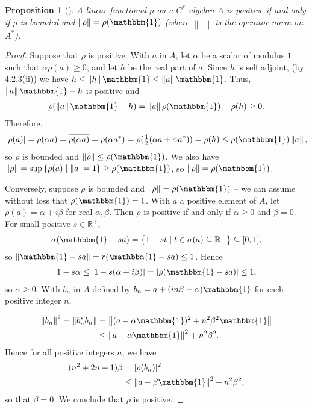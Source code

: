\documentclass[11pt,a4paper]{report}
\theoremstyle{plain}
\newtheorem{prop}{Proposition}
\theoremstyle{definition}
\newcommand{\1}{\mathbbm{1}}
\newcommand{\R}{\mathbb{R}}
\newcommand{\spec}[1]{\sigma(#1)}
\begin{document}
\begin{prop}[{\cite[4.3.2]{kadison83}}]\label{prop:432}
	A linear functional $\rho$ on a $C^\ast$-algebra $A$ is positive if and only if 
	$\rho$ is bounded and $\left\|\rho\right\| = \rho(\1)$ (where 
	$\left\|\cdot\right\|$ is the operator norm on $A^\ast$).
\end{prop}
\begin{proof}
	Suppose that $\rho$ is positive. With $a$ in $A$, let $\alpha$ be a scalar of 
	modulus $1$ such that $\alpha\rho(a)\geq 0$, and let $h$ be the real part of 
	$a$. Since $h$ is self adjoint, (by 4.2.3(ii)) we have $h \leq \left\|h\right\|\1 
	\leq \left\|a\right\|\1$. Thus, $\left\|a\right\|\1-h$ is positive and 
	\begin{align*}
		\rho(\left\|a\right\|\1-h) = \left\|a\right\|\rho(\1)-\rho(h) \geq 0.
	\end{align*}
	Therefore,
	\begin{align*}
		|\rho(a)| 	= \rho(\alpha a) = \overline{\rho(\alpha a)} 
					= \rho(\overline{\alpha}a^\ast) 
					= \rho(\tfrac{1}{2}(\alpha a +\overline{\alpha}a^\ast))
					= \rho(h) \leq \rho(\1) \left\|a\right\|,
	\end{align*}
	so $\rho$ is bounded and $\left\|\rho\right\| \leq \rho(\1)$. We also have 
	$\left\|\rho\right\| = \sup\left\{\rho(a) \mid \left\|a\right| = 1\right\} \geq 
	\rho(\1)$, so $\left\|\rho\right\|=\rho(\1)$.

	
	Conversely, suppose $\rho$ is bounded and $\left\|\rho\right\| = \rho(\1)$ -- we 
	can assume without loss that $\rho(\1)=1$. With $a$ a positive element of $A$, 
	let $\rho(a)=\alpha+i\beta$ for real $\alpha,\beta$. Then $\rho$ is positive if 
	and only if $\alpha \geq 0$ and $\beta = 0$.
	For small positive $s \in \R^+$, 
	\begin{align*}
		\spec{\1-sa} = \left\{1-st \mid t\in \spec{a} 
							\subseteq \R^+\right\} \subseteq [0,1],
	\end{align*}
	so $\left\|\1-sa\right\| = r(\1-sa) \leq 1$. Hence
	\begin{align*}
		1-s\alpha \leq |1-s(\alpha+i\beta)| = |\rho(\1 - sa)| \leq 1,
	\end{align*}
	so $\alpha\geq0$. With $b_n$ in $A$ defined by $b_n= a+(in\beta-\alpha)\1$ for 
	each positive integer $n$,

	\begin{align*}
				\left\|b_n\right\|^2 = \left\|b_n^\ast b_n\right\| 
		&= 		\left\|(a-\alpha\1)^2 + n^2\beta^2\1\right\| 								\\
		&\leq 	\left\|a-\alpha\1\right\|^2 +n^2\beta^2.
	\end{align*}
	Hence for all positive integers $n$, we have
	\begin{align*}
				(n^2+2n+1)\beta 
		&=	 	|\rho(b_n)|^2  																\\
		&\leq 	\left\|a-\beta\1\right\|^2 +n^2\beta^2,
	\end{align*}
	so that $\beta=0$. We conclude that $\rho$ is positive.
\end{proof}
\end{document}
